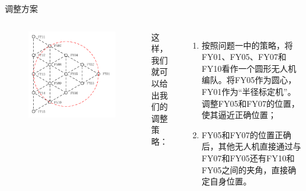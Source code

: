 \documentclass[aspectratio=169]{beamer}
\begin{document}
\begin{frame}{调整方案}
    \begin{columns}
        \begin{figure}[!ht]
            \centering
            \includegraphics[width=\textwidth]{图片/问题2示意图.pdf}
        \end{figure}

        这样，我们就可以给出我们的调整策略：
        \begin{enumerate}
            \item 按照问题一中的策略，将FY01、FY05、FY07和FY10看作一个圆形无人机编队。将FY05作为圆心，FY01作为“半径标定机”。调整FY05和FY07的位置，使其逼近正确位置；
            \item FY05和FY07的位置正确后，其他无人机直接通过与FY07和FY05还有FY10和FY05之间的夹角，直接确定自身位置。
        \end{enumerate}
    \end{columns}
\end{frame}
\end{document}
